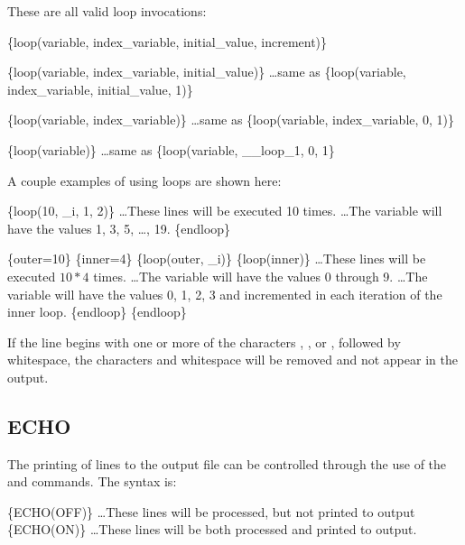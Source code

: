 These are all valid loop invocations:
\begin{apinp}
\{loop(variable, index\_variable, initial\_value, increment)\}
\end{apinp}

\begin{apinp}
\{loop(variable, index\_variable, initial\_value)\}
\ldots same as \{loop(variable, index\_variable, initial\_value, 1)\}
\end{apinp}

\begin{apinp}
\{loop(variable, index\_variable)\}
\ldots same as \{loop(variable, index\_variable, 0, 1)\}
\end{apinp}

\begin{apinp}
\{loop(variable)\}
\ldots same as \{loop(variable, \_\_loop\_1, 0, 1\}
\end{apinp}

A couple examples of using loops are shown here:
\begin{apinp}
\{loop(10, \_i, 1, 2)\}
\ldots These lines will be executed 10 times.
\ldots The variable  will have the values 1, 3, 5, \ldots, 19. 
\{endloop\}
\end{apinp}

\begin{apinp}
\{outer=10\} \{inner=4\}
\{loop(outer, \_i)\}
\{loop(inner)\}
\ldots These lines will be executed $10 * 4$ times.
\ldots The variable  will have the values 0 through 9. 
\ldots The variable  will have the values 0, 1, 2, 3 and incremented in each iteration of the inner loop.
\{endloop\}
\{endloop\}
\end{apinp}

If the line begins with one or more of the characters \cmd{\#}, \cmd{\$}, or \cmd{//}, followed by whitespace, the characters and whitespace will be removed and not appear in the output.

\subsection{ECHO}\label{echo} The printing of lines to the output file can be controlled
through the use of the  and 
commands. The syntax is:

\begin{apinp}
\{ECHO(OFF)\}
\ldots These lines will be processed, but not printed to output
\{ECHO(ON)\}
\ldots These lines will be both processed and printed to output.
\end{apinp}

